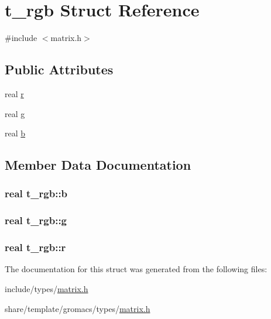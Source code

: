 \hypertarget{structt__rgb}{\section{t\-\_\-rgb \-Struct \-Reference}
\label{structt__rgb}
}


{\ttfamily \#include $<$matrix.\-h$>$}

\subsection*{\-Public \-Attributes}
\begin{DoxyCompactItemize}
\item 
real \hyperlink{structt__rgb_a7369d538f923ff4a574b05b84d09c5df}{r}
\item 
real \hyperlink{structt__rgb_a312b19378bc662ef830947ecd752f411}{g}
\item 
real \hyperlink{structt__rgb_a4d50e6fc9a98eeee0b77dd1b2a75f5c6}{b}
\end{DoxyCompactItemize}


\subsection{\-Member \-Data \-Documentation}
\hypertarget{structt__rgb_a4d50e6fc9a98eeee0b77dd1b2a75f5c6}{
\subsubsection[{b}]{\setlength{\rightskip}{0pt plus 5cm}real {\bf t\-\_\-rgb\-::b}}}\label{structt__rgb_a4d50e6fc9a98eeee0b77dd1b2a75f5c6}
\hypertarget{structt__rgb_a312b19378bc662ef830947ecd752f411}{
\subsubsection[{g}]{\setlength{\rightskip}{0pt plus 5cm}real {\bf t\-\_\-rgb\-::g}}}\label{structt__rgb_a312b19378bc662ef830947ecd752f411}
\hypertarget{structt__rgb_a7369d538f923ff4a574b05b84d09c5df}{
\subsubsection[{r}]{\setlength{\rightskip}{0pt plus 5cm}real {\bf t\-\_\-rgb\-::r}}}\label{structt__rgb_a7369d538f923ff4a574b05b84d09c5df}


\-The documentation for this struct was generated from the following files\-:\begin{DoxyCompactItemize}
\item 
include/types/\hyperlink{include_2types_2matrix_8h}{matrix.\-h}\item 
share/template/gromacs/types/\hyperlink{share_2template_2gromacs_2types_2matrix_8h}{matrix.\-h}\end{DoxyCompactItemize}
